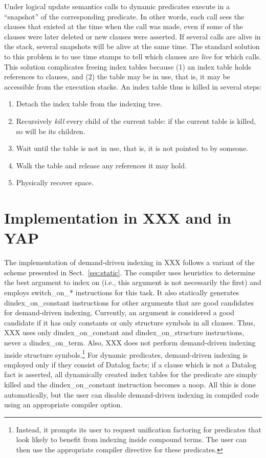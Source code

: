 \documentclass{llncs}
\newcommand{\instr}[1]{\textsf{#1}}
\newcommand{\switchSTAR}{\mbox{\instr{switch\_on\_*}}\xspace}
\newcommand{\jitiONterm}{\mbox{\instr{dindex\_on\_term}}\xspace}
\newcommand{\jitiONconstant}{\mbox{\instr{dindex\_on\_constant}}\xspace}
\newcommand{\jitiONstructure}{\mbox{\instr{dindex\_on\_structure}}\xspace}
\newcommand{\JITI}{demand-driven indexing\xspace}
\begin{document}
Under logical update semantics calls to dynamic predicates execute in a
``snapshot'' of the corresponding predicate. In other words, each call
sees the clauses that existed at the time when the call was made, even if
some of the clauses were later deleted or new clauses were asserted.
If several calls are alive in the stack, several snapshots will be
alive at the same time. The standard solution to this problem is to
use time stamps to tell which clauses are \emph{live} for which calls.
%
This solution complicates freeing index tables because (1) an index
table holds references to clauses, and (2) the table may be in use,
that is, it may be accessible from the execution stacks. An index
table thus is killed in several steps:
\begin{enumerate}
\item Detach the index table from the indexing tree.
\item Recursively \emph{kill} every child of the current table:
  if the current table is killed, so will be its children.
\item Wait until the table is not in use, that is, it is not pointed
  to by someone.
\item Walk the table and release any references it may hold.
\item Physically recover space.
\end{enumerate}


\section{Implementation in XXX and in YAP} \label{sec:impl}
The implementation of \JITI in XXX follows a variant of the scheme
presented in Sect.~\ref{sec:static}. The compiler uses heuristics to
determine the best argument to index on (i.e., this argument is not
necessarily the first) and employs \switchSTAR instructions for this
task. It also statically generates \jitiONconstant instructions for
other arguments that are good candidates for \JITI.
Currently, an argument is considered a good candidate if it has only
constants or only structure symbols in all clauses. Thus, XXX uses
only \jitiONconstant and \jitiONstructure instructions, never a
\jitiONterm. Also, XXX does not perform \JITI inside structure
symbols.\footnote{Instead, it prompts its user to request unification
factoring for predicates that look likely to benefit from indexing
inside compound terms. The user can then use the appropriate compiler
directive for these predicates.} For dynamic predicates, \JITI is
employed only if they consist of Datalog facts; if a clause which is
not a Datalog fact is asserted, all dynamically created index tables
for the predicate are simply killed and the \jitiONconstant
instruction becomes a \instr{noop}. All this is done automatically,
but the user can disable \JITI in compiled code using an appropriate
compiler option.
\end{document}
